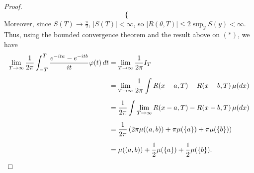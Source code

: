 \documentclass[11pt,oneside,english]{amsart}
\theoremstyle{definition}
\newcommand{\1}{\mathbbm{1}}
\begin{document}
\begin{enumerate}[leftmargin=*]
\begin{proof}
\[\begin{cases}
\end{cases}
\]
Moreover, since $S(T)\to\frac{\pi}{2}$, $|S(T)|<\infty$, so $|R(\theta,T)|\leq 2\sup_y S(y)<\infty$. Thus, using the bounded convergence theorem and the result above on $(*)$, we have
\begin{align*}
\lim_{T\to\infty}\frac{1}{2\pi}\int_{-T}^T\frac{e^{-ita}-e^{-itb}}{it}\varphi(t)\,dt&=\lim_{T\to\infty} \frac{1}{2\pi}I_T\\[2mm]
&=\lim_{T\to\infty}\frac{1}{2\pi}\int R(x-a,T)-R(x-b,T)\,\mu(dx)\\[2mm]
&=\frac{1}{2\pi}\int \lim_{T\to\infty} R(x-a,T)-R(x-b,T)\,\mu(dx)\\[2mm]
&=\frac{1}{2\pi}\left(2\pi\mu((a,b))+\pi\mu(\{a\})+\pi\mu(\{b\})\right)\\[2mm]
&=\mu((a,b))+\frac{1}{2}\mu(\{a\})+\frac{1}{2}\mu(\{b\}).\qedhere
\end{align*}
\end{proof}

\end{enumerate}
\end{document}
